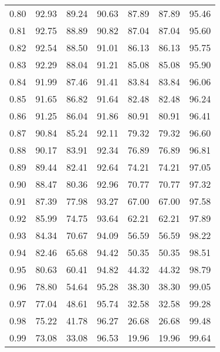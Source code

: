 \begin{tabular}{|c|c|c|c|c|c|c|}
      0.80 &     92.93 &     89.24 &      90.63 &   87.89 &      87.89 &         95.46 \\
      0.81 &     92.75 &     88.89 &      90.82 &   87.04 &      87.04 &         95.60 \\
      0.82 &     92.54 &     88.50 &      91.01 &   86.13 &      86.13 &         95.75 \\
      0.83 &     92.29 &     88.04 &      91.21 &   85.08 &      85.08 &         95.90 \\
      0.84 &     91.99 &     87.46 &      91.41 &   83.84 &      83.84 &         96.06 \\
      0.85 &     91.65 &     86.82 &      91.64 &   82.48 &      82.48 &         96.24 \\
      0.86 &     91.25 &     86.04 &      91.86 &   80.91 &      80.91 &         96.41 \\
      0.87 &     90.84 &     85.24 &      92.11 &   79.32 &      79.32 &         96.60 \\
      0.88 &     90.17 &     83.91 &      92.34 &   76.89 &      76.89 &         96.81 \\
      0.89 &     89.44 &     82.41 &      92.64 &   74.21 &      74.21 &         97.05 \\
      0.90 &     88.47 &     80.36 &      92.96 &   70.77 &      70.77 &         97.32 \\
      0.91 &     87.39 &     77.98 &      93.27 &   67.00 &      67.00 &         97.58 \\
      0.92 &     85.99 &     74.75 &      93.64 &   62.21 &      62.21 &         97.89 \\
      0.93 &     84.34 &     70.67 &      94.09 &   56.59 &      56.59 &         98.22 \\
      0.94 &     82.46 &     65.68 &      94.42 &   50.35 &      50.35 &         98.51 \\
      0.95 &     80.63 &     60.41 &      94.82 &   44.32 &      44.32 &         98.79 \\
      0.96 &     78.80 &     54.64 &      95.28 &   38.30 &      38.30 &         99.05 \\
      0.97 &     77.04 &     48.61 &      95.74 &   32.58 &      32.58 &         99.28 \\
      0.98 &     75.22 &     41.78 &      96.27 &   26.68 &      26.68 &         99.48 \\
      0.99 &     73.08 &     33.08 &      96.53 &   19.96 &      19.96 &         99.64 \\
\bottomrule
\end{tabular}
